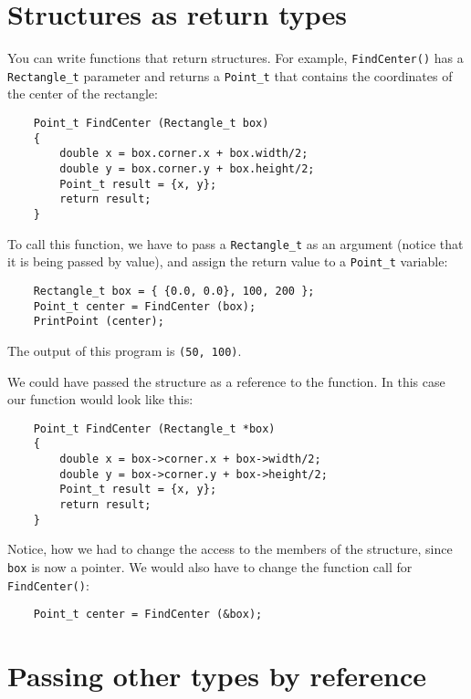 

\section{Structures as return types}

You can write functions that return structures.  For example,
{\tt FindCenter()} has a {\tt Rectangle\_t} parameter and
returns a {\tt Point\_t} that contains the coordinates of the
center of the rectangle:

\begin{verbatim}
	Point_t FindCenter (Rectangle_t box)
	{
		double x = box.corner.x + box.width/2;
		double y = box.corner.y + box.height/2;
		Point_t result = {x, y};
		return result;
	}
\end{verbatim}
%
To call this function, we have to pass a {\tt Rectangle\_t} as an argument
(notice that it is being passed by value), and assign the
return value to a {\tt Point\_t} variable:

\begin{verbatim}
	Rectangle_t box = { {0.0, 0.0}, 100, 200 };
	Point_t center = FindCenter (box);
	PrintPoint (center);
\end{verbatim}
%
The output of this program is {\tt (50, 100)}.

We could have passed the structure as a reference to the
function. In this case our function would look like this:

\begin{verbatim}
	Point_t FindCenter (Rectangle_t *box)
	{
		double x = box->corner.x + box->width/2;
		double y = box->corner.y + box->height/2;
		Point_t result = {x, y};
		return result;
	}
\end{verbatim}
Notice, how we had to change the access to the members of the 
structure, since {\tt box} is now a pointer. 
We would also have to change the function call for {\tt FindCenter()}:

\begin{verbatim}
	Point_t center = FindCenter (&box);
\end{verbatim}

\section {Passing other types by reference}

